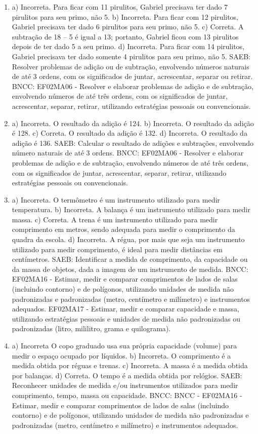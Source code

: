 \begin{enumerate}
\item
a) Incorreta. Para ficar com 11 pirulitos, Gabriel precisava ter dado 7
pirulitos para seu primo, não 5.
b) Incorreta. Para ficar com 12 pirulitos, Gabriel precisava ter dado 6
pirulitos para seu primo, não 5.
c) Correta. A subtração de 18 -- 5 é igual a 13; portanto, Gabriel ficou
com 13 pirulitos depois de ter dado 5 a seu primo.
d) Incorreta. Para ficar com 14 pirulitos, Gabriel precisava ter dado
somente 4 pirulitos para seu primo, não 5.
SAEB: Resolver problemas de adição ou de subtração, envolvendo
números naturais de até 3 ordens, com os significados de juntar,
acrescentar, separar ou retirar.
BNCC: EF02MA06 - Resolver e elaborar problemas de adição e de subtração,
envolvendo números de até três ordens, com os significados de juntar,
acrescentar, separar, retirar, utilizando estratégias pessoais ou convencionais.

\item
a) Incorreta. O resultado da adição é 124.
b) Incorreta. O resultado da adição é 128.
c) Correta. O resultado da adição é 132.
d) Incorreta. O resultado da adição é 136.
SAEB: Calcular o resultado de adições e subtrações, envolvendo
número naturais de até 3 ordens.
BNCC: EF02MA06 - Resolver e elaborar problemas de adição e de subtração,
envolvendo números de até três ordens, com os significados de juntar,
acrescentar, separar, retirar, utilizando estratégias pessoais ou
convencionais.

\item
a) Incorreta. O termômetro é um instrumento utilizado para medir temperatura.
b) Incorreta. A balança é um instrumento utilizado para medir massa.
c) Correta. A trena é um instrumento utilizado para medir comprimento
em metros, sendo adequada para medir o comprimento da quadra da escola.
d) Incorreta. A régua, por mais que seja um instrumento utilizado para
medir comprimento, é ideal para medir distâncias em centímetros.
SAEB: Identificar a medida de comprimento, da capacidade ou da
massa de objetos, dada a imagem de um instrumento de medida.
BNCC: EF02MA16 - Estimar, medir e comparar comprimentos de lados de
salas (incluindo contorno) e de polígonos, utilizando unidades de medida
não padronizadas e padronizadas (metro, centímetro e milímetro) e
instrumentos adequados. EF02MA17 - Estimar, medir e comparar capacidade
e massa, utilizando estratégias pessoais e unidades de medida não
padronizadas ou padronizadas (litro, mililitro, grama e quilograma).

\item
a) Incorreta O copo graduado usa sua própria capacidade (volume) para
medir o espaço ocupado por líquidos.
b) Incorreta. O comprimento é a medida obtida por réguas e trenas.
c) Incorreta. A massa é a medida obtida por balanças.
d) Correta. O tempo é a medida obtida por relógios.
SAEB: Reconhecer unidades de medida e/ou instrumentos utilizados
para medir comprimento, tempo, massa ou capacidade.
BNCC: BNCC - EF02MA16 - Estimar, medir e comparar comprimentos de lados
de salas (incluindo contorno) e de polígonos, utilizando unidades de
medida não padronizadas e padronizadas (metro, centímetro e milímetro) e
instrumentos adequados.


\end{enumerate}
